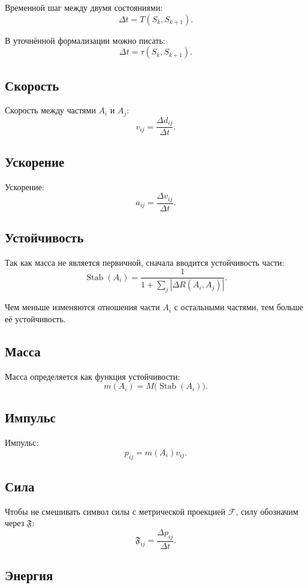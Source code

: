 \documentclass[12pt,a4paper]{article}
\newcommand{\Rel}{R}
\newcommand{\Stab}{\operatorname{Stab}}
\newcommand{\Metric}{\mathcal F}
\newcommand{\Force}{\mathfrak F}
\begin{document}
Временной шаг между двумя состояниями:
\[
\Delta t=T(S_k,S_{k+1}).
\]

В уточнённой формализации можно писать:
\[
\Delta t=\tau(S_k,S_{k+1}).
\]

\subsection{Скорость}

Скорость между частями \(A_i\) и \(A_j\):
\[
v_{ij}=\frac{\Delta d_{ij}}{\Delta t}.
\]

\subsection{Ускорение}

Ускорение:
\[
a_{ij}=\frac{\Delta v_{ij}}{\Delta t}.
\]

\subsection{Устойчивость}

Так как масса не является первичной, сначала вводится устойчивость части:
\[
\Stab(A_i)=\frac{1}{1+\sum_j |\Delta\Rel(A_i,A_j)|}.
\]

Чем меньше изменяются отношения части \(A_i\) с остальными частями, тем больше её устойчивость.

\subsection{Масса}

Масса определяется как функция устойчивости:
\[
m(A_i)=M\bigl(\Stab(A_i)\bigr).
\]

\subsection{Импульс}

Импульс:
\[
p_{ij}=m(A_i)v_{ij}.
\]

\subsection{Сила}

Чтобы не смешивать символ силы с метрической проекцией \(\Metric\), силу обозначим через \(\Force\):
\[
\Force_{ij}=\frac{\Delta p_{ij}}{\Delta t}.
\]

\subsection{Энергия}
\end{document}
